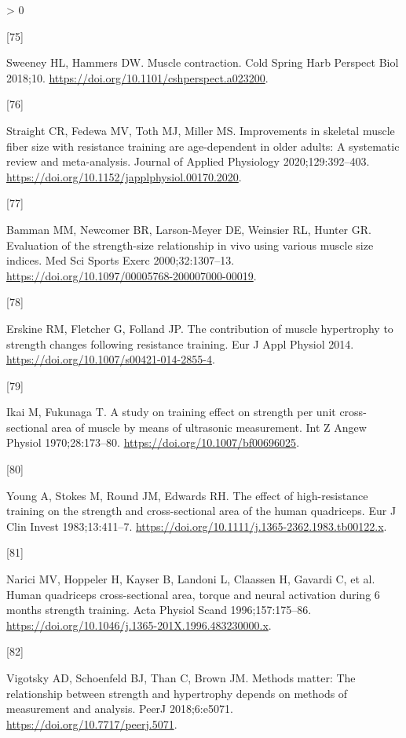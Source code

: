 \documentclass[twoside,10pt]{gihclass} %
\newlength{\cslhangindent}
\newlength{\csllabelwidth}
\newenvironment{CSLReferences}[3] %
 {%
  \setlength{\parindent}{0pt}
  \ifodd #1 \everypar{\setlength{\hangindent}{\cslhangindent}}\ignorespaces\fi
  \ifnum #2 > 0
  \setlength{\parskip}{#2\baselineskip}
  \fi
 }%
 {}
\newcommand{\CSLLeftMargin}[1]{\parbox[t]{\maxof{\widthof{#1}}{\csllabelwidth}}{#1}}
\newcommand{\CSLRightInline}[1]{\parbox[t]{\linewidth}{#1}}
\begin{document}
\begin{CSLReferences}{0}{0}
\leavevmode\hypertarget{ref-RN2756}{}%
\CSLLeftMargin{{[}75{]} }
\CSLRightInline{Sweeney HL, Hammers DW. Muscle contraction. Cold Spring Harb Perspect Biol 2018;10. \url{https://doi.org/10.1101/cshperspect.a023200}.}

\leavevmode\hypertarget{ref-RN2669}{}%
\CSLLeftMargin{{[}76{]} }
\CSLRightInline{Straight CR, Fedewa MV, Toth MJ, Miller MS. Improvements in skeletal muscle fiber size with resistance training are age-dependent in older adults: A systematic review and meta-analysis. Journal of Applied Physiology 2020;129:392--403. \url{https://doi.org/10.1152/japplphysiol.00170.2020}.}

\leavevmode\hypertarget{ref-RN2758}{}%
\CSLLeftMargin{{[}77{]} }
\CSLRightInline{Bamman MM, Newcomer BR, Larson-Meyer DE, Weinsier RL, Hunter GR. Evaluation of the strength-size relationship in vivo using various muscle size indices. Med Sci Sports Exerc 2000;32:1307--13. \url{https://doi.org/10.1097/00005768-200007000-00019}.}

\leavevmode\hypertarget{ref-RN1142}{}%
\CSLLeftMargin{{[}78{]} }
\CSLRightInline{Erskine RM, Fletcher G, Folland JP. The contribution of muscle hypertrophy to strength changes following resistance training. Eur J Appl Physiol 2014. \url{https://doi.org/10.1007/s00421-014-2855-4}.}

\leavevmode\hypertarget{ref-RN2629}{}%
\CSLLeftMargin{{[}79{]} }
\CSLRightInline{Ikai M, Fukunaga T. A study on training effect on strength per unit cross-sectional area of muscle by means of ultrasonic measurement. Int Z Angew Physiol 1970;28:173--80. \url{https://doi.org/10.1007/bf00696025}.}

\leavevmode\hypertarget{ref-RN2737}{}%
\CSLLeftMargin{{[}80{]} }
\CSLRightInline{Young A, Stokes M, Round JM, Edwards RH. The effect of high-resistance training on the strength and cross-sectional area of the human quadriceps. Eur J Clin Invest 1983;13:411--7. \url{https://doi.org/10.1111/j.1365-2362.1983.tb00122.x}.}

\leavevmode\hypertarget{ref-RN2735}{}%
\CSLLeftMargin{{[}81{]} }
\CSLRightInline{Narici MV, Hoppeler H, Kayser B, Landoni L, Claassen H, Gavardi C, et al. Human quadriceps cross-sectional area, torque and neural activation during 6 months strength training. Acta Physiol Scand 1996;157:175--86. \url{https://doi.org/10.1046/j.1365-201X.1996.483230000.x}.}

\leavevmode\hypertarget{ref-RN2158}{}%
\CSLLeftMargin{{[}82{]} }
\CSLRightInline{Vigotsky AD, Schoenfeld BJ, Than C, Brown JM. Methods matter: The relationship between strength and hypertrophy depends on methods of measurement and analysis. PeerJ 2018;6:e5071. \url{https://doi.org/10.7717/peerj.5071}.}


\end{CSLReferences}
\end{document}
